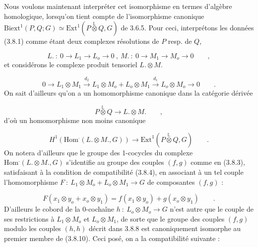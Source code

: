 Nous voulons maintenant interpréter cet isomorphisme en termes d'algèbre homologique, lorsqu'on tient compte de l'isomorphisme canonique $\mathrm{Biext}^1(P,Q;G) \simeq \mathrm{Ext}^1(P \overset{\mathbb{L}}{\otimes} Q,G)$ de 3.6.5. Pour ceci, interprétons les données (3.8.1) comme étant deux complexes résolutions de $P$ resp. de $Q$,

\begin{equation}\tag{3.8.9}
L. \ : \ 0 \longrightarrow L_1 \longrightarrow L_o \longrightarrow 0 \ , \ M. \ : \ 0 \longrightarrow M_1 \longrightarrow M_o \longrightarrow 0 \qquad ,
\end{equation}
et considérons le complexe produit tensoriel $L. \otimes M.$

\begin{equation*}
0 \longrightarrow L_1 \otimes M_1 \overset{d_2}{\longrightarrow} L_1 \otimes M_o + L_o \otimes M_1 \overset{d_1}{\longrightarrow} L_o \otimes M_o \longrightarrow 0 \qquad .
\end{equation*}
On sait d'ailleurs qu'on a un homomorphisme canonique dans la catégorie dérivée

\begin{equation*}
P \overset{\mathbb{L}}{\otimes} Q \longrightarrow L. \otimes M. \qquad ,
\end{equation*}
d'où un homomorphisme non moins canonique

\begin{equation}\tag{3.8.10}
H^1(\mathrm{Hom}^{.}(L. \otimes M.,G)) \longrightarrow \mathrm{Ext}^1(P \overset{\mathbb{L}}{\otimes} Q,G) \qquad .
\end{equation}
On notera d'ailleurs que le groupe des 1-cocycles du complexe $\mathrm{Hom}^{.}(L. \otimes M.,G)$ s'identifie au groupe des couples $(f,g)$ comme en (3.8.3), satisfaisant à la condition de compatibilité (3.8.4), en associant à un tel couple l'homomorphisme $F \ : \ L_1 \otimes M_o + L_o \otimes M_1 \longrightarrow G$ de composantes $(f,g)$ :

\begin{equation}\tag{3.8.11}
F(x_1 \otimes y_o + x_o \otimes y_1) = f(x_1 \otimes y_o) + g(x_o \otimes y_1) \qquad .
\end{equation}
D'ailleurs le cobord de la 0-cochaîne $h \ : \ L_o \otimes M_o \longrightarrow G$ n'est autre que le couple de ses restrictions à $L_1 \otimes M_o$ et $L_o \otimes M_1$, de sorte que le groupe des
couples $(f,g)$ modulo les couples $(h,h)$ décrit dans 3.8.8 est canoniquement isomorphe au premier membre de (3.8.10). Ceci posé, on a la compatibilité suivante :

